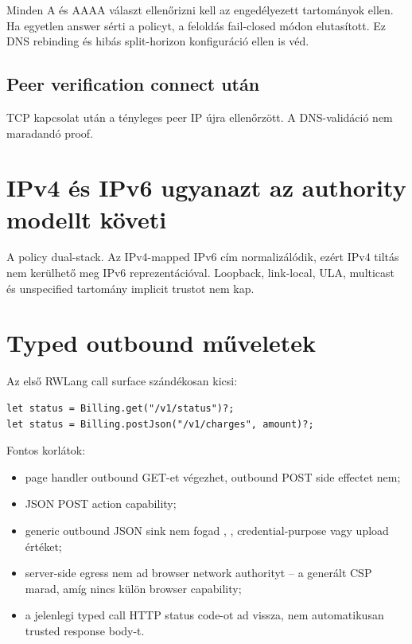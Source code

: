 Minden A és AAAA választ ellenőrizni kell az engedélyezett tartományok ellen. Ha egyetlen answer sérti a policyt, a feloldás fail-closed módon elutasított. Ez DNS rebinding és hibás split-horizon konfiguráció ellen is véd.

\subsection*{Peer verification connect után}

TCP kapcsolat után a tényleges peer IP újra ellenőrzött. A DNS-validáció nem maradandó proof.

\section{IPv4 és IPv6 ugyanazt az authority modellt követi}

A policy dual-stack. Az IPv4-mapped IPv6 cím normalizálódik, ezért IPv4 tiltás nem kerülhető meg IPv6 reprezentációval. Loopback, link-local, ULA, multicast és unspecified tartomány implicit trustot nem kap.

\section{Typed outbound műveletek}

Az első RWLang call surface szándékosan kicsi:

\begin{lstlisting}[language=RWLang]
let status = Billing.get("/v1/status")?;
let status = Billing.postJson("/v1/charges", amount)?;
\end{lstlisting}

Fontos korlátok:

\begin{itemize}
  \item page handler outbound GET-et végezhet, outbound POST side effectet nem;
  \item JSON POST action capability;
  \item generic outbound JSON sink nem fogad , , credential-purpose vagy upload értéket;
  \item server-side egress nem ad browser network authorityt -- a generált CSP  marad, amíg nincs külön browser capability;
  \item a jelenlegi typed call HTTP status code-ot ad vissza, nem automatikusan trusted response body-t.
\end{itemize}

